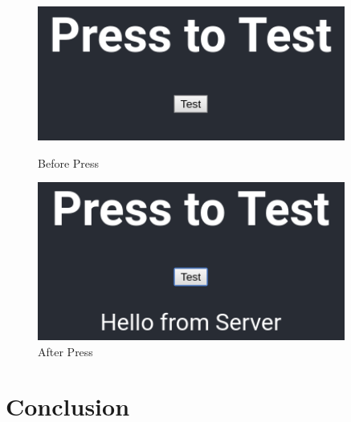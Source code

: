\documentclass[12pt]{article}
\begin{document}
\begin{figure}[!ht]
    \centering
    \begin{minipage}{0.45\textwidth}
        \centering
        \includegraphics[width=0.9\textwidth]{images/part1pretest} %
        \caption{Before Press}
        \label{fig:beforepress}
    \end{minipage}\hfill
    \begin{minipage}{0.45\textwidth}
        \centering
        \includegraphics[width=0.9\textwidth]{images/part1posttest} %
        \caption{After Press}
        \label{fig:afterpress}
    \end{minipage}
\end{figure}

\part*{Conclusion}



\end{document}

